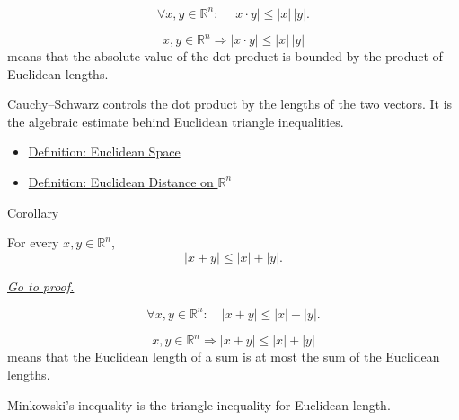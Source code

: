 \begin{remark*}
\[
\forall x,y\in\mathbb{R}^n{:}\quad |x\cdot y|\leq |x|\,|y|.
\]
\end{remark*}

\begin{remark*}
\[
x,y\in\mathbb{R}^n
\Longrightarrow
|x\cdot y|\leq |x|\,|y|
\]
means that the absolute value of the dot product is bounded by the product of
Euclidean lengths.
\end{remark*}

\begin{remark*}[Interpretation]
Cauchy--Schwarz controls the dot product by the lengths of the two vectors.
It is the algebraic estimate behind Euclidean triangle inequalities.
\end{remark*}

\begin{dependencies}
\begin{itemize}
  \item \hyperref[def:euclidean-space]{Definition: Euclidean Space}
  \item \hyperref[def:euclidean-distance-rn]{Definition: Euclidean Distance on \(\mathbb{R}^n\)}
\end{itemize}
\end{dependencies}

\begin{corollarybox}{Corollary}
\begin{corollary}\label{cor:minkowski-inequality-rn}
For every \(x,y\in\mathbb{R}^n\),
\[
  |x+y|\leq |x|+|y|.
\]

\smallskip
\noindent
\hyperref[prf:minkowski-inequality-rn]{\textit{Go to proof.}}
\end{corollary}
\end{corollarybox}

\begin{remark*}
\[
\forall x,y\in\mathbb{R}^n{:}\quad |x+y|\leq |x|+|y|.
\]
\end{remark*}

\begin{remark*}
\[
x,y\in\mathbb{R}^n
\Longrightarrow
|x+y|\leq |x|+|y|
\]
means that the Euclidean length of a sum is at most the sum of the Euclidean
lengths.
\end{remark*}

\begin{remark*}[Interpretation]
Minkowski's inequality is the triangle inequality for Euclidean length.
\end{remark*}

